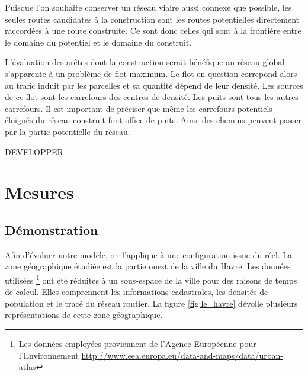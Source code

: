 \documentclass[10pt]{article}
\begin{document}
Puisque l'on souhaite conserver un réseau viaire aussi connexe que
possible, les seules routes candidates à la construction sont les
routes potentielles directement raccordées à une route construite. Ce
sont donc celles qui sont à la frontière entre le domaine du potentiel
et le domaine du construit.

L'évaluation des arêtes dont la construction serait bénéfique au
réseau global s'apparente à un problème de flot maximum. Le flot en
question correpond alors au trafic induit par les parcelles et sa
quantité dépend de leur densité. Les sources de ce flot sont les
carrefours des centres de densité. Les puits sont tous les autres
carrefours. Il est important de préciser que même les carrefours
potentiels éloignés du réseau construit font office de puits. Ainsi
des chemins peuvent passer par la partie potentielle du réseau.

DEVELOPPER

\begin{figure}[H]
  \centering
  
  \caption{}
  \label{}
\end{figure}

\section{Mesures}

\subsection{Démonstration}

Afin d'évaluer notre modèle, on l'applique à une configuration issue
du réel. La zone géographique étudiée est la partie ouest de la ville
du Havre. Les données utilisées \footnote{Les données employées
  proviennent de l'Agence Européenne pour l'Environnement
  \url{http://www.eea.europa.eu/data-and-maps/data/urban-atlas}} ont
été réduites à un sous-espace de la ville pour des raisons de temps de
calcul. Elles comprennent les informations cadastrales, les densités
de population et le tracé du réseau routier. La figure
\ref{fig:le_havre} dévoile plusieurs représentations de cette zone
géographique.
\end{document}
